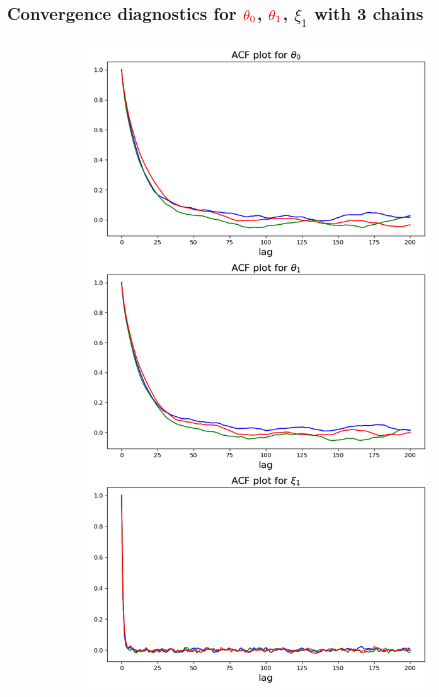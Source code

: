 \documentclass{beamer}
\begin{document}
\begin{frame}
    \frametitle{Convergence diagnostics for $\textcolor{red}{\theta_0}$, $\textcolor{red}{\theta_1}$, $\xi_1$ with 3 chains}

\vspace{-0.5cm}
    \begin{figure}[H]
        \centering
        
        \begin{subfigure}{0.3\textwidth}
            \centering
            \includegraphics[width=\linewidth]{figures/vacuum_lock_reduced_acf_plot_theta.png}

\end{subfigure}
\end{figure}
\end{frame}
\end{document}
